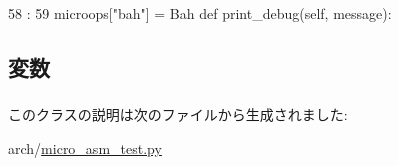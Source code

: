 \begin{DoxyCode}
58                      :
59         microops["bah"] = Bah
    def print_debug(self, message):
\end{DoxyCode}


\subsection{変数}
\hypertarget{classmicro__asm__test_1_1TestMacroop_a6b7cf57f95798ede8f3b8f2c4100f7c3}{
\subsubsection[{directives}]{}}
\label{classmicro__asm__test_1_1TestMacroop_a6b7cf57f95798ede8f3b8f2c4100f7c3}


このクラスの説明は次のファイルから生成されました:\begin{DoxyCompactItemize}
\item 
arch/\hyperlink{micro__asm__test_8py}{micro\_\-asm\_\-test.py}\end{DoxyCompactItemize}
